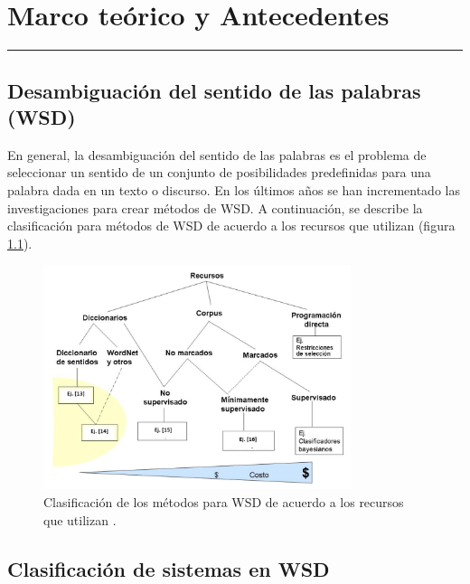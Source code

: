 \chapter{Marco teórico y Antecedentes }
\hrule \bigskip \vspace*{1cm}

\section{Desambiguación del sentido de las palabras (WSD)}
En general, la desambiguación del sentido de las palabras es el problema de seleccionar un sentido de un conjunto de posibilidades predefinidas para una palabra dada en un texto o discurso. 
En los últimos años se han incrementado las investigaciones para crear métodos de WSD. A continuación, se describe la clasificación para métodos de WSD de acuerdo a los recursos que utilizan (figura \ref{fig:desambiguacion_WSD}).

  \begin{figure}[h!]
	  \begin{center}
    \includegraphics[angle=0, width=9cm]{Graficos/desambiguacion_WSD}
	  \caption{Clasificación de los métodos para WSD de acuerdo a los recursos que utilizan \cite{001}.}
    \label{fig:desambiguacion_WSD}
    \end{center}
	\end{figure}

\section{Clasificación de sistemas en WSD}
